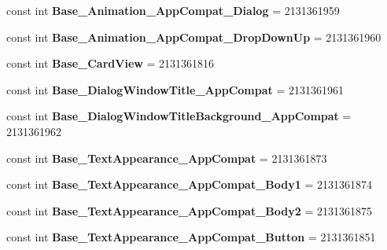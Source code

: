 \begin{DoxyCompactItemize}
\item 
\mbox{\label{classXaria_1_1Resource_1_1Style_a55a01e4008e2136e046bbdbef093608a}} 
const int {\bfseries Base\+\_\+\+Animation\+\_\+\+App\+Compat\+\_\+\+Dialog} = 2131361959
\item 
\mbox{\label{classXaria_1_1Resource_1_1Style_a8e46544d264fedecc7025cbd7a3f0bbf}} 
const int {\bfseries Base\+\_\+\+Animation\+\_\+\+App\+Compat\+\_\+\+Drop\+Down\+Up} = 2131361960
\item 
\mbox{\label{classXaria_1_1Resource_1_1Style_a63647140dc5e34748c4944493efb5f6d}} 
const int {\bfseries Base\+\_\+\+Card\+View} = 2131361816
\item 
\mbox{\label{classXaria_1_1Resource_1_1Style_a439dd30b10447f7211c9cc155457ca1e}} 
const int {\bfseries Base\+\_\+\+Dialog\+Window\+Title\+\_\+\+App\+Compat} = 2131361961
\item 
\mbox{\label{classXaria_1_1Resource_1_1Style_aea718a586fb8005ebf4645339c3fba1b}} 
const int {\bfseries Base\+\_\+\+Dialog\+Window\+Title\+Background\+\_\+\+App\+Compat} = 2131361962
\item 
\mbox{\label{classXaria_1_1Resource_1_1Style_a6e9651e3d61b8b445651b17ed03aaa21}} 
const int {\bfseries Base\+\_\+\+Text\+Appearance\+\_\+\+App\+Compat} = 2131361873
\item 
\mbox{\label{classXaria_1_1Resource_1_1Style_a5dc5dcaaf9dee6e7d62f048d3ac28e25}} 
const int {\bfseries Base\+\_\+\+Text\+Appearance\+\_\+\+App\+Compat\+\_\+\+Body1} = 2131361874
\item 
\mbox{\label{classXaria_1_1Resource_1_1Style_a9a08e81e626407c40b29e8c67ae55705}} 
const int {\bfseries Base\+\_\+\+Text\+Appearance\+\_\+\+App\+Compat\+\_\+\+Body2} = 2131361875
\item 
\mbox{\label{classXaria_1_1Resource_1_1Style_ace61eedf6aed17f12c65e9684f4fceb4}} 
const int {\bfseries Base\+\_\+\+Text\+Appearance\+\_\+\+App\+Compat\+\_\+\+Button} = 2131361851

\end{DoxyCompactItemize}
